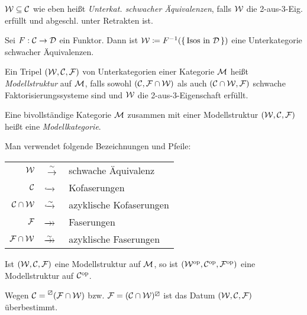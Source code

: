 \documentclass{cheat-sheet}
\newcommand{\nspace}[1]{\foreach \i in {1,...,#1}{ \! }} %
\newcommand{\xtwoheadrightarrow}[1]{\xrightarrow{#1}\nspace{8}\to\,\,} %
\newcommand{\lhhe}{\boxslash} %
\begin{document}
\begin{defn}
  $\mathcal{W} \subseteq \mathcal{C}$ wie eben heißt \emph{Unterkat. schwacher Äquivalenzen}, falls $\mathcal{W}$ die 2-aus-3-Eig. erfüllt und abgeschl. unter Retrakten ist.
\end{defn}

\begin{bsp}
  Sei $F : \mathcal{C} \to \mathcal{D}$ ein Funktor. Dann ist $\mathcal{W} \coloneqq F^{-1}(\{ \, \text{Isos in $\mathcal{D}$} \, \})$ eine Unterkategorie schwacher Äquivalenzen.
\end{bsp}

\begin{defn}
  Ein Tripel $(\mathcal{W}, \mathcal{C}, \mathcal{F})$ von Unterkategorien einer Kategorie $\mathcal{M}$ heißt \emph{Modellstruktur} auf $\mathcal{M}$, falls sowohl $(\mathcal{C}, \mathcal{F} \cap \mathcal{W})$ als auch $(\mathcal{C} \cap \mathcal{W}, \mathcal{F})$ schwache Faktorisierungssysteme sind und $\mathcal{W}$ die 2-aus-3-Eigenschaft erfüllt.
\end{defn}

\begin{defn}
  Eine bivollständige Kategorie $\mathcal{M}$ zusammen mit einer Modellstruktur $(\mathcal{W}, \mathcal{C}, \mathcal{F})$ heißt eine \emph{Modellkategorie}.
\end{defn}

\begin{sprech}
  Man verwendet folgende Bezeichnungen und Pfeile:
  \begin{center}
    \begin{tabular}{r l l}
      $\mathcal{W}$ & $\xrightarrow{{\sim}}$ & schwache Äquivalenz \\
      $\mathcal{C}$ & $\xhookrightarrow{\phantom{{\sim}}}$ & Kofaserungen \\
      $\mathcal{C} \cap \mathcal{W}$ & $\xhookrightarrow{{\sim}}$ & azyklische Kofaserungen \\
      $\mathcal{F}$ & $\xtwoheadrightarrow{\phantom{{\sim}}}$ & Faserungen \\
      $\mathcal{F} \cap \mathcal{W}$ & $\xtwoheadrightarrow{{\sim}}$ & azyklische Faserungen
    \end{tabular}
  \end{center}
\end{sprech}

\begin{bem}
  Ist $(\mathcal{W}, \mathcal{C}, \mathcal{F})$ eine Modellstruktur auf $\mathcal{M}$, so ist $(\mathcal{W}^{\mathrm{op}}, \mathcal{C}^{\mathrm{op}}, \mathcal{F}^{\mathrm{op}})$ eine Modellstruktur auf $\mathcal{C}^{\mathrm{op}}$.
\end{bem}

\begin{bem}
  Wegen $\Cat = \prescript{\lhhe}{} (\Fat \cap \Wat)$ bzw. $\Fat = (\Cat \cap \Wat)^\lhhe$ ist das Datum $(\mathcal{W}, \mathcal{C}, \mathcal{F})$ überbestimmt.
\end{bem}
\end{document}

